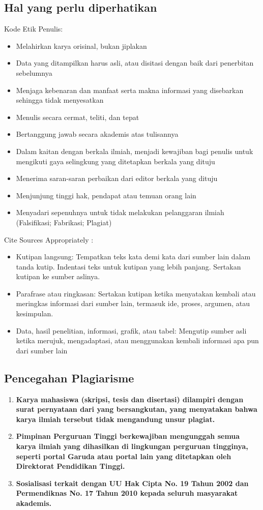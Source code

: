 \subsection{Hal yang perlu diperhatikan}
Kode Etik Penulis:
\begin{itemize}
    \item Melahirkan karya orisinal, bukan jiplakan
    \item Data yang ditampilkan harus asli, atau disitasi dengan baik dari penerbitan sebelumnya
    \item Menjaga kebenaran dan manfaat serta makna informasi yang disebarkan sehingga tidak menyesatkan
    \item Menulis secara cermat, teliti, dan tepat
    \item Bertanggung jawab secara akademis atas tulisannya
    \item Dalam kaitan dengan berkala ilmiah, menjadi kewajiban bagi penulis untuk mengikuti gaya selingkung yang ditetapkan berkala yang dituju
    \item Menerima saran-saran perbaikan dari editor berkala yang dituju
    \item Menjunjung tinggi hak, pendapat atau temuan orang lain
    \item Menyadari sepenuhnya untuk tidak melakukan pelanggaran ilmiah (Falsifikasi; Fabrikasi; Plagiat)
\end{itemize}
Cite Sources Appropriately :
\begin{itemize}
    \item Kutipan langsung: Tempatkan teks kata demi kata dari sumber lain dalam tanda kutip. Indentasi teks untuk kutipan yang lebih panjang. Sertakan kutipan ke sumber aslinya.
    \item Parafrase atau ringkasan: Sertakan kutipan ketika menyatakan kembali atau meringkas informasi dari sumber lain, termasuk ide, proses, argumen, atau kesimpulan.
    \item Data, hasil penelitian, informasi, grafik, atau tabel: Mengutip sumber asli ketika merujuk, mengadaptasi, atau menggunakan kembali informasi apa pun dari sumber lain
\end{itemize}

\subsection{Pencegahan Plagiarisme}
\begin{enumerate}
    \item \textbf{Karya mahasiswa (skripsi, tesis dan disertasi) dilampiri dengan surat pernyataan dari
    yang bersangkutan, yang menyatakan bahwa karya ilmiah tersebut tidak mengandung
    unsur plagiat.}
    \item \textbf{Pimpinan Perguruan Tinggi berkewajiban mengunggah semua karya ilmiah yang dihasilkan
    di lingkungan perguruan tingginya, seperti portal Garuda atau portal lain
    yang ditetapkan oleh Direktorat Pendidikan Tinggi.} 
    \item \textbf{Sosialisasi terkait dengan UU Hak Cipta No. 19 Tahun 2002 dan Permendiknas No. 17
    Tahun 2010 kepada seluruh masyarakat akademis.} 
\end{enumerate}

